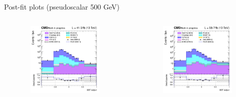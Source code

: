 \documentclass[8pt]{beamer}
\begin{document}
\begin{frame}{Post-fit plots (pseudoscalar 500 GeV)}
\begin{columns}
\begin{column}{0.33\textwidth}
\begin{center}
     			\includegraphics[width=1.0\textwidth, height=100pt]{figs/postfits/2017/log_cratio_ST_topCR_ll_BDT_tDM500_TTbar_BDT_output_pseudoscalar500_customBinsAttempt7.png}
    		\end{center}		
		\end{column} 
		\begin{column}{0.33\textwidth}
			\begin{center}
			\begin{block}{}\end{block}	
     			\includegraphics[width=1.0\textwidth, height=100pt]{figs/postfits/2018/log_cratio_ST_topCR_ll_BDT_tDM500_TTbar_BDT_output_pseudoscalar500_customBinsAttempt7.png}
    		\end{center}		
		\end{column}
\end{columns}


\end{frame}
\end{document}
